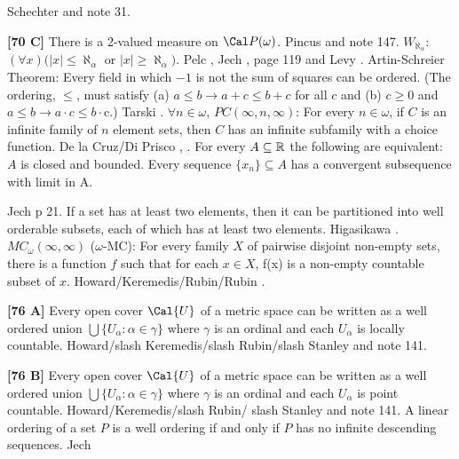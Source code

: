 \ac{Schechter} \cite{1996a} and note 31.
\smallskip
\item{}{\bf [70 C]} There is a 2-valued measure on
${\Cal P}(\omega )$.  \ac{Pincus} \cite{1972c} and note 147.
\medskip
{} $W_{\aleph_{\alpha}}$:
$(\forall x)(|x|\le\aleph_{\alpha }$ or $|x|\ge \aleph_{\alpha})$.
\ac{Pelc} \cite{1978}, \ac{Jech} \cite{1973b}, page 119 and \ac{Levy}
\cite{1964}.
\medskip
{} Artin-Schreier Theorem:  Every field in which
$-1$ is not the sum of squares can be ordered. (The ordering,
$\le $, must satisfy
(a) $a\le b\rightarrow a + c\le b + c$ for all $c$ and
(b) $c\ge 0$ and $a\le b\rightarrow a\cdot c\le b\cdot $c.) \ac{Tarski}
\cite{1954b}.
\medskip
{} $\forall n\in\omega$, $PC(\infty,n,\infty)$:  For
every $n\in\omega$, if $C$ is an infinite family of $n$ element sets, then
$C$ has an infinite subfamily with a choice function.  \ac{De la Cruz/Di Prisco} \cite{1998a}, \cite{1998b}.
\medskip
{} For every $A\subseteq\Bbb R$ the following are
equivalent:
  $A$ is closed and bounded.
  Every sequence $\{x_{n}\}\subseteq A$ has a
convergent subsequence with limit in A.
\item{}\ac{Jech} \cite{1973b} p 21.
\medskip
{} If a set has at least two elements, then it
can be partitioned into well orderable subsets, each of which has at
least two elements. \ac{Higasikawa} \cite{1995}.
\smallskip
{} $MC_\omega(\infty,\infty)$ ($\omega$-MC): For
every family $X$ of pairwise disjoint non-empty sets, there is a
function $f$ such that for each $x\in X$, f(x) is a non-empty countable
subset of $x$. \ac{Howard/Keremedis/Rubin/Rubin} \cite{1998b}.
\smallskip
\item{}{\bf [76 A]} Every open cover $\Cal{U}$ of a metric space  can be
written as a well ordered union $\bigcup\{U_\alpha:\alpha\in\gamma\}$
where $\gamma$ is an ordinal and each $U_\alpha$ is locally countable.
\ac{Howard/slash Keremedis/slash Rubin/slash Stanley} \cite{1999} and
note 141.
\smallskip
\item{}{\bf [76 B]} Every open cover $\Cal{U}$ of a metric space  can be
written as a well ordered union $\bigcup\{U_\alpha:\alpha\in\gamma\}$
where $\gamma$ is an ordinal and each $U_\alpha$ is point countable.
\ac{Howard/Keremedis/slash Rubin/ slash Stanley} \cite{1999} and note 141.
\medskip
{} A linear ordering of a set $P$ is a well ordering
if and only if $P$ has no infinite descending sequences. \ac{Jech}
